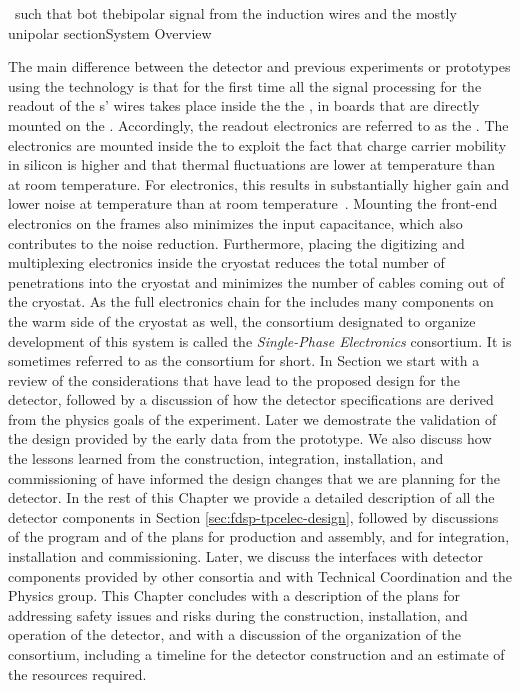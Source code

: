 \ such that bot thebipolar signal from the induction wires and the mostly unipolar section{System Overview}
\label{sec:fdsp-tpcelec-overview}

The main difference between the   detector and 
previous experiments or prototypes using the  technology is
that for the first time all the signal processing for the readout of the
s' wires takes place inside the the , in boards that 
are directly mounted on the . Accordingly, the  
readout electronics are referred to as the . The electronics are 
mounted inside the  to exploit the fact that charge carrier 
mobility in silicon is higher and that thermal fluctuations are lower 
at  temperature than at room temperature. For  
electronics, this results in substantially higher gain and lower noise 
at  temperature than at room temperature~\cite{larCMOS}.  
Mounting the front-end electronics on the  frames also minimizes 
the input capacitance, which also contributes to the noise reduction.  
Furthermore, placing the digitizing and multiplexing electronics inside 
the cryostat reduces the total number of penetrations into the cryostat 
and minimizes the number of cables coming out of the cryostat.  
As the full  electronics chain for the  includes 
many components on the warm side of the cryostat as well, the  
consortium designated to organize development of this system is called 
the  \textit{Single-Phase  Electronics} consortium. 
It is sometimes referred to as the  consortium for short.
In Section we start with a review of the considerations that
have lead to the proposed design for the   detector,
followed by a discussion of how the detector specifications are derived
from the physics goals of the experiment. Later we demostrate the 
validation of the design provided by the early data from the 
prototype. We also discuss how the lessons learned from the construction,
integration, installation, and commissioning of  have 
informed the design changes that we are planning for the 
 detector. In the rest of this Chapter we provide a detailed
description of all the  detector components in Section
\ref{sec:fdsp-tpcelec-design}, followed by discussions of the 
program and of the plans for production and assembly, and for integration,
installation and commissioning. Later, we discuss the interfaces with
detector components provided by other consortia and with Technical
Coordination and the Physics group. This Chapter concludes with a description
of the plans for addressing safety issues and risks during the
construction, installation, and operation of the detector, and with
a discussion of the organization of the  consortium,
including a timeline for the detector construction and an estimate
of the resources required.

